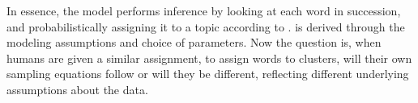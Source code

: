 In essence, the model performs inference by looking at each word in
succession, and probabilistically assigning it to a topic according to
.   is derived through the
modeling assumptions and choice of parameters.  Now the question is,
when humans are given a similar assignment, to assign words to
clusters, will their own sampling equations follow 
or will they be different, reflecting different underlying assumptions
about the data.

